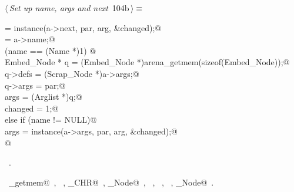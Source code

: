 \documentclass[a4paper]{report}
\begin{document}
\begin{flushleft} \small
\begin{minipage}{\linewidth}\label{scrap218}\raggedright\small
{} $\langle\,${\it Set up name, args and next}\nobreak\ {\footnotesize {104b}}$\,\rangle\equiv$
\vspace{-1ex}
\begin{list}{}{} \item
\mbox{}\verb@next = instance(a->next, par, arg, &changed);@\\
\mbox{}\verb@name = a->name;@\\
\mbox{}\verb@if (name == (Name *)1) {@\\
\mbox{}\verb@   Embed_Node * q = (Embed_Node *)arena_getmem(sizeof(Embed_Node));@\\
\mbox{}\verb@   q->defs = (Scrap_Node *)a->args;@\\
\mbox{}\verb@   q->args = par;@\\
\mbox{}\verb@   args = (Arglist *)q;@\\
\mbox{}\verb@   changed = 1;@\\
\mbox{}\verb@} else if (name != NULL)@\\
\mbox{}\verb@  args = instance(a->args, par, arg, &changed);@\\
\mbox{}@{\NWsep}
\end{list}
\vspace{-1.5ex}
\footnotesize
\begin{list}{}{\setlength{\itemsep}{-\parsep}\setlength{\itemindent}{-\leftmargin}}
\item \NWtxtMacroRefIn\ .
\item \NWtxtIdentsUsed\nobreak\  \verb@arena_getmem@\nobreak\ , \verb@Arglist@\nobreak\ , \verb@ARG_CHR@\nobreak\ , \verb@Embed_Node@\nobreak\ , \verb@instance@\nobreak\ , \verb@lookup@\nobreak\ , \verb@Name@\nobreak\ , \verb@Scrap_Node@\nobreak\ .
\item{}
\end{list}
\end{minipage}\vspace{4ex}
\end{flushleft}
\end{document}

